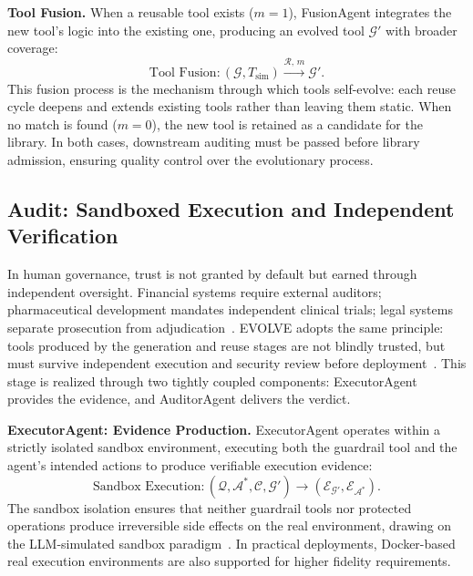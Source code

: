   \noindent\textbf{Tool Fusion.} When a reusable tool exists ($m = 1$), FusionAgent integrates the new tool's logic into the existing one, producing an evolved tool $\mathcal{G}'$ with broader coverage:
  \begin{equation}
      \text{Tool Fusion} : (\mathcal{G}, T_{\text{sim}}) \xrightarrow{\mathcal{R},\, m} \mathcal{G}'.
  \end{equation}
  This fusion process is the mechanism through which tools self-evolve: each reuse cycle deepens and extends existing tools rather than leaving them static. When no match is found ($m = 0$), the new tool is retained as a
   candidate for the library. In both cases, downstream auditing must be passed before library admission, ensuring quality control over the evolutionary process.


  \subsection{Audit: Sandboxed Execution and Independent Verification}

  In human governance, trust is not granted by default but earned through independent oversight. Financial systems require external auditors; pharmaceutical development mandates independent clinical trials; legal systems
   separate prosecution from adjudication~\citep{taleb2012things}. EVOLVE adopts the same principle: tools produced by the generation and reuse stages are not blindly trusted, but must survive independent execution and
  security review before deployment~\citep{han2025alignment,shao2025misevovle}. This stage is realized through two tightly coupled components: ExecutorAgent provides the evidence, and AuditorAgent delivers the verdict.

  \noindent\textbf{ExecutorAgent: Evidence Production.} ExecutorAgent operates within a strictly isolated sandbox environment, executing both the guardrail tool and the agent's intended actions to produce verifiable
  execution evidence:
  \begin{equation}
      \text{Sandbox Execution} : \left( \mathcal{Q}, \mathcal{A}^*, \mathcal{C}, \mathcal{G}' \right) \rightarrow \left( \mathcal{E}_{\mathcal{G}'}, \mathcal{E}_{\mathcal{A}^*} \right).
  \end{equation}
  The sandbox isolation ensures that neither guardrail tools nor protected operations produce irreversible side effects on the real environment, drawing on the LLM-simulated sandbox paradigm~\citep{ruan2023identifying}.
  In practical deployments, Docker-based real execution environments are also supported for higher fidelity requirements.

